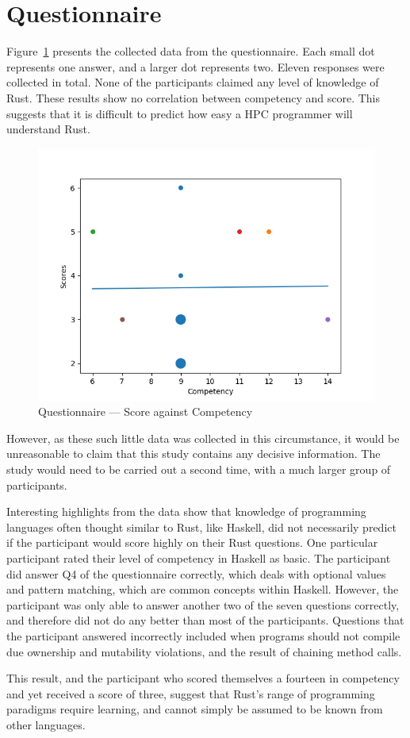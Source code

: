 \section{Questionnaire}
Figure~\ref{fig:questions} presents the collected data from the questionnaire. Each small dot represents one answer, and a larger dot represents two. Eleven responses were collected in total. None of the participants claimed any level of knowledge of Rust.
These results show no correlation between competency and score. This suggests that it is difficult to predict how easy a HPC programmer will understand Rust. 

\begin{figure}[h]
\centering
\includegraphics[width=.8\linewidth]{figs/questions/scatter.png}
\caption{Questionnaire --- Score against Competency}\label{fig:questions}
\end{figure}

However, as these such little data was collected in this circumstance, it would be unreasonable to claim that this study contains any decisive information. The study would need to be carried out a second time, with a much larger group of participants.

Interesting highlights from the data show that knowledge of programming languages often thought similar to Rust, like Haskell, did not necessarily predict if the participant would score highly on their Rust questions. One particular participant rated their level of competency in Haskell as basic. The participant did answer Q4 of the questionnaire correctly, which deals with optional values and pattern matching, which are common concepts within Haskell. However, the participant was only able to answer another two of the seven questions correctly, and therefore did not do any better than most of the participants. Questions that the participant answered incorrectly included when programs should not compile due ownership and mutability violations, and the result of chaining method calls.

This result, and the participant who scored themselves a fourteen in competency and yet received a score of three, suggest that Rust's range of programming paradigms require learning, and cannot simply be assumed to be known from other languages.
